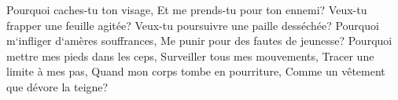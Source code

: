 \verse Pourquoi caches-tu ton visage, Et me prends-tu pour ton ennemi? 
\verse Veux-tu frapper une feuille agitée? Veux-tu poursuivre une paille desséchée? 
\verse Pourquoi m`infliger d`amères souffrances, Me punir pour des fautes de jeunesse? 
\verse Pourquoi mettre mes pieds dans les ceps, Surveiller tous mes mouvements, Tracer une limite à mes pas, 
\verse Quand mon corps tombe en pourriture, Comme un vêtement que dévore la teigne? 

\chapter{}

